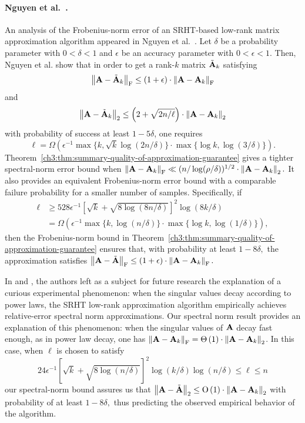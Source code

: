 \paragraph{Nguyen et al.~\cite{NDT09}.}
An analysis of the Frobenius-norm error of an SRHT-based low-rank matrix
approximation algorithm appeared in Nguyen et al.~\cite{NDT09}.
Let $\delta$ be a probability parameter with $0 < \delta < 1$ and $\epsilon$ be an accuracy parameter with $0 < \epsilon <1 $.
Then, Nguyen et al. show that in order to
get a rank-$k$ matrix $\tilde{\mathbf{A}}_k$ satisfying
$$ \left\| \mathbf{A} - \tilde{\mathbf{A}}_k\right\|_\mathrm{F} \le \left(1 + \epsilon \right)  \cdot \left\|\mathbf{A}-\mathbf{A}_k\right\|_\mathrm{F}$$
and
\[
 \left\|\mathbf{A} -\tilde{\mathbf{A}}_k\right\|_2 \leq
 \left( 2 + \sqrt{2 n / \ell} \right) \cdot \left\|\mathbf{A}-\mathbf{A}_k\right\|_2
\]
with probability of success at least $1 - 5 \delta$, one requires
\[
\ell = \Omega\left( \epsilon^{-1} \max\{  k, \sqrt{k} \log(2n/\delta) \}  \cdot \max\{ \log k, \log(3/\delta) \}  \right).
\]
Theorem~\ref{ch3:thm:summary-quality-of-approximation-guarantee} gives a tighter 
spectral-norm error bound when
$\left\|\mathbf{A} - \mathbf{A}_k\right\|_\mathrm{F} \ll (n / \log(\rho/\delta))^{1/2} \cdot \left\|\mathbf{A} - \mathbf{A}_k\right\|_2.$ 
It also provides an equivalent Frobenius-norm error bound with a comparable 
failure probability for a smaller number of samples. Specifically, if
\begin{align*}
 \ell & \geq 528 \epsilon^{-1}[\sqrt{k} + \sqrt{8 \log(8 n/\delta)}]^2 \log(8k/\delta) \\
  &= \Omega\left( \epsilon^{-1} \max\{k, \log(n/\delta)\} \cdot \max\{\log k, \log(1/\delta)\} \right),
\end{align*}
then the Frobenius-norm bound in Theorem~\ref{ch3:thm:summary-quality-of-approximation-guarantee} 
ensures that, with probability at least $1-8\delta,$ the approximation 
satisfies $\left\| \mathbf{A} - \tilde{\mathbf{A}}\right\|_\mathrm{F} \le \left(1 + \epsilon \right)  \cdot \left\|\mathbf{A}-\mathbf{A}_k\right\|_\mathrm{F}.$

In \cite{HMT11} and \cite{NDT09}, the authors left as a subject for future research 
the explanation of a curious experimental phenomenon: when the singular values 
decay according to power laws, the SRHT low-rank approximation algorithm empirically 
achieves relative-error spectral norm approximations. Our spectral norm result 
provides an explanation of this phenomenon: when the singular values of $\mathbf{A}$ 
decay fast enough, as in power law decay, one has 
$ \left\|\mathbf{A}-\mathbf{A}_k\right\|_\mathrm{F} = \Theta\left( 1 \right) \cdot \left\|\mathbf{A}-\mathbf{A}_k\right\|_2 $. 
In this case, when $\ell$ is chosen to satisfy
$$ 24 \epsilon^{-1} \left[\sqrt{k} + \sqrt{8\log(n/\delta)} \right]^2 \log(k/\delta) \log(n/\delta) \leq \ell \leq n$$
our spectral-norm bound assures us that 
$
 \left\|\mathbf{A} - \tilde{\mathbf{A}}\right\|_2 \leq \mathrm{O}\left( 1 \right) \cdot \left\|\mathbf{A}-\mathbf{A}_k\right\|_2
$
with probability of at least $1 - 8\delta,$ thus predicting the observed 
empirical behavior of the algorithm.

